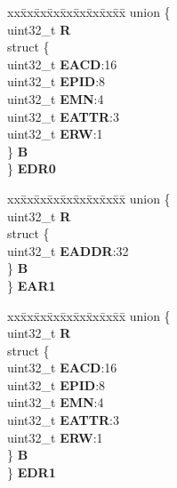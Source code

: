 \begin{DoxyCompactItemize}
\begin{tabbing}
\end{tabbing}\item 
\mbox{\label{structMPU__tag_ac760ac382f453f0a0990478e84d3e69c}} 
\begin{tabbing}
xx\=xx\=xx\=xx\=xx\=xx\=xx\=xx\=xx\=\kill
union \{\\
\>uint32\_t {\bfseries R}\\
\>struct \{\\
\>\>uint32\_t {\bfseries EACD}:16\\
\>\>uint32\_t {\bfseries EPID}:8\\
\>\>uint32\_t {\bfseries EMN}:4\\
\>\>uint32\_t {\bfseries EATTR}:3\\
\>\>uint32\_t {\bfseries ERW}:1\\
\>\} {\bfseries B}\\
\} {\bfseries EDR0}\\

\end{tabbing}\item 
\mbox{\label{structMPU__tag_a50485e4c531a6cbf44d9fee6b811a57a}} 
\begin{tabbing}
xx\=xx\=xx\=xx\=xx\=xx\=xx\=xx\=xx\=\kill
union \{\\
\>uint32\_t {\bfseries R}\\
\>struct \{\\
\>\>uint32\_t {\bfseries EADDR}:32\\
\>\} {\bfseries B}\\
\} {\bfseries EAR1}\\

\end{tabbing}\item 
\mbox{\label{structMPU__tag_a9978ee1388b0ba5bdf82c3ed75ef55cf}} 
\begin{tabbing}
xx\=xx\=xx\=xx\=xx\=xx\=xx\=xx\=xx\=\kill
union \{\\
\>uint32\_t {\bfseries R}\\
\>struct \{\\
\>\>uint32\_t {\bfseries EACD}:16\\
\>\>uint32\_t {\bfseries EPID}:8\\
\>\>uint32\_t {\bfseries EMN}:4\\
\>\>uint32\_t {\bfseries EATTR}:3\\
\>\>uint32\_t {\bfseries ERW}:1\\
\>\} {\bfseries B}\\
\} {\bfseries EDR1}\\


\end{tabbing}
\end{DoxyCompactItemize}
